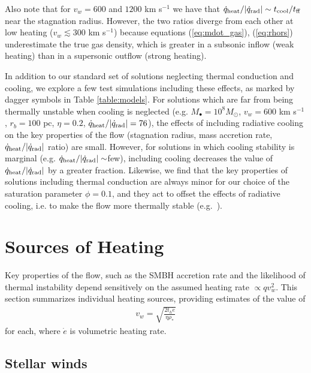 \documentclass[usenatbib,fleqn]{mn2e}
\newcommand{\rhostar}{\rho_*}
\begin{document}
Also note that for $v_{w}=600$ and $1200$ km s$^{-1}$ we have that
$\dot{q}_{\rm heat}/|\dot{q}_{\rm rad}| \sim t_{\rm cool}/t_{\rm ff}$
near the stagnation radius.  However, the two ratios diverge from each
other at low heating ($v_{w} \lesssim 300$ km s$^{-1}$) because
equations (\ref{eq:mdot_gas}), (\ref{eq:rhors}) underestimate the true
gas density, which is greater in a subsonic inflow (weak heating) than
in a supersonic outflow (strong heating).

In addition to our standard set of solutions neglecting thermal conduction and cooling, we explore a few test simulations including these effects, as marked by dagger symbols in Table \ref{table:models}.  For solutions which are far from being thermally unstable when cooling is neglected (e.g. $M_{\bullet} = 10^{8}M_{\odot}$, $v_{w} = 600$ km s$^{-1}$, $r_{b} = 100$ pc, $\eta = 0.2$, $\dot{q}_{\rm heat}/|\dot{q}_{\rm rad}| = 76$), the effects of including radiative cooling on the key properties of the flow (stagnation radius, mass accretion rate, $\dot{q}_{\rm heat}/|\dot{q}_{\rm rad}|$ ratio) are small.  However, for solutions in which cooling stability is marginal (e.g. $\dot{q}_{\rm heat}/|\dot{q}_{\rm rad}| \sim $few), including cooling decreases the value of $\dot{q}_{\rm heat}/|\dot{q}_{\rm rad}|$ by a greater fraction.  Likewise, we find that the key properties of solutions including thermal conduction are always minor for our choice of the saturation parameter $\phi = 0.1$, and they act to offset the effects of radiative cooling, i.e. to make the flow more thermally stable (e.g.~\citealt{Zakamska&Narayan03}).  

\section{Sources of Heating}
\label{sec:heating}

Key properties of the flow, such as the SMBH accretion rate and the likelihood of thermal instability depend sensitively on the assumed heating rate $\propto qv_{w}^{2}$.  This section summarizes individual heating sources, providing estimates of the value of
\begin{align}
  v_{w} = \sqrt{\frac{2 t_h \dot{e}}{\eta \rhostar}}
  \label{eq:vw_eff}
\end{align}
for each, where $\dot{e}$ is volumetric heating rate.  

\subsection{Stellar winds} 
\end{document}
